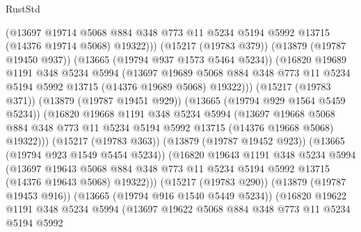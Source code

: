 \begin{lexlean}{RustStd}
\begin{coremodule}
                    (@13697
                      @19714
                      @5068
                      @884
                      @348
                      @773
                      @11
                      @5234
                      @5194
                      @5992
                      @13715
                      (@14376 @19714 @5068)
                      @19322)))
                (@15217 (@19783 @379))
                (@13879 (@19787 @19450 @937))
                (@13665 (@19794 @937 @1573 @5464 @5234))
                (@16820
                  @19689
                  @1191
                  @348
                  @5234
                  @5994
                  (@13697
                    @19689
                    @5068
                    @884
                    @348
                    @773
                    @11
                    @5234
                    @5194
                    @5992
                    @13715
                    (@14376 @19689 @5068)
                    @19322)))
              (@15217 (@19783 @371))
              (@13879 (@19787 @19451 @929))
              (@13665 (@19794 @929 @1564 @5459 @5234))
              (@16820
                @19668
                @1191
                @348
                @5234
                @5994
                (@13697
                  @19668
                  @5068
                  @884
                  @348
                  @773
                  @11
                  @5234
                  @5194
                  @5992
                  @13715
                  (@14376 @19668 @5068)
                  @19322)))
            (@15217 (@19783 @363))
            (@13879 (@19787 @19452 @923))
            (@13665 (@19794 @923 @1549 @5454 @5234))
            (@16820
              @19643
              @1191
              @348
              @5234
              @5994
              (@13697
                @19643
                @5068
                @884
                @348
                @773
                @11
                @5234
                @5194
                @5992
                @13715
                (@14376 @19643 @5068)
                @19322)))
          (@15217 (@19783 @290))
          (@13879 (@19787 @19453 @916))
          (@13665 (@19794 @916 @1540 @5449 @5234))
          (@16820
            @19622
            @1191
            @348
            @5234
            @5994
            (@13697
              @19622
              @5068
              @884
              @348
              @773
              @11
              @5234
              @5194
              @5992

\end{coremodule}
\end{lexlean}
